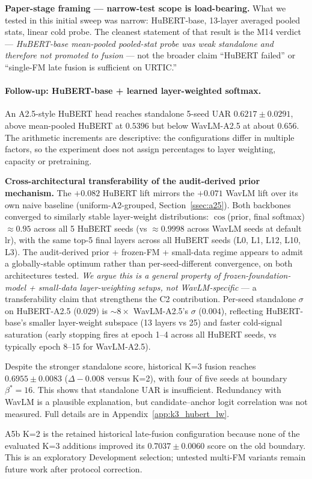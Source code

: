 \textbf{Paper-stage framing --- narrow-test scope is load-bearing.} What we tested in this initial sweep was narrow: HuBERT-base, 13-layer averaged pooled stats, linear cold probe. The cleanest statement of that result is the M14 verdict --- \emph{HuBERT-base mean-pooled pooled-stat probe was weak standalone and therefore not promoted to fusion} --- not the broader claim ``HuBERT failed'' or ``single-FM late fusion is sufficient on URTIC.''

\paragraph{Follow-up: HuBERT-base + learned layer-weighted softmax.} An A2.5-style HuBERT head reaches standalone 5-seed UAR $\mathbf{0.6217 \pm 0.0291}$, above mean-pooled HuBERT at $0.5396$ but below WavLM-A2.5 at about $0.656$. The arithmetic increments are descriptive: the configurations differ in multiple factors, so the experiment does not assign percentages to layer weighting, capacity or pretraining.

\textbf{Cross-architectural transferability of the audit-derived prior mechanism.} The $+0.082$ HuBERT lift mirrors the $+0.071$ WavLM lift over its own naive baseline (uniform-A2-grouped, Section~\ref{ssec:a25}). Both backbones converged to similarly stable layer-weight distributions: $\cos$(prior, final softmax) $\approx 0.95$ across all 5 HuBERT seeds (vs $\approx 0.9998$ across WavLM seeds at default lr), with the same top-5 final layers across all HuBERT seeds (L0, L1, L12, L10, L3). The audit-derived prior + frozen-FM + small-data regime appears to admit a globally-stable optimum rather than per-seed-different convergence, on both architectures tested. \emph{We argue this is a general property of frozen-foundation-model + small-data layer-weighting setups, not WavLM-specific} --- a transferability claim that strengthens the C2 contribution. Per-seed standalone $\sigma$ on HuBERT-A2.5 ($0.029$) is $\sim 8\times$ WavLM-A2.5's $\sigma$ ($0.004$), reflecting HuBERT-base's smaller layer-weight subspace (13 layers vs 25) and faster cold-signal saturation (early stopping fires at epoch 1--4 across all HuBERT seeds, vs typically epoch 8--15 for WavLM-A2.5).

Despite the stronger standalone score, historical K=3 fusion reaches $0.6955 \pm 0.0083$ ($\Delta-0.008$ versus K=2), with four of five seeds at boundary $\beta^*=16$. This shows that standalone UAR is insufficient. Redundancy with WavLM is a plausible explanation, but candidate--anchor logit correlation was not measured. Full details are in Appendix~\ref{app:k3_hubert_lw}.

A5b K=2 is the retained historical late-fusion configuration because none of the evaluated K=3 additions improved its $0.7037 \pm 0.0060$ score on the old boundary. This is an exploratory Development selection; untested multi-FM variants remain future work after protocol correction.
